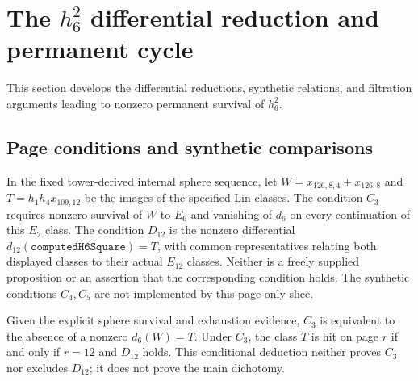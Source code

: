 \section{The $h_6^2$ differential reduction and permanent cycle}
\label{chap:near126}

This section develops the differential reductions, synthetic relations, and
filtration arguments leading to nonzero permanent survival of $h_6^2$.

\subsection{Page conditions and synthetic comparisons}

\begin{definition}
  \label{def:near126-fixed-page-conditions}
  \notready
  In the fixed tower-derived internal sphere sequence, let
  $W=x_{126,8,4}+x_{126,8}$ and $T=h_1h_4x_{109,12}$ be the images of the
  specified Lin classes.  The condition $C_3$ requires nonzero survival of
  $W$ to $E_6$ and vanishing of $d_6$ on every continuation of this $E_2$
  class.  The condition $D_{12}$ is the nonzero differential
  $d_{12}(\mathtt{computedH6Square})=T$, with common representatives relating
  both displayed classes to their actual $E_{12}$ classes.
  Neither is a freely supplied proposition or an assertion that the
  corresponding condition holds.  The synthetic conditions $C_4,C_5$ are
  not implemented by this page-only slice.
\end{definition}

\begin{lemma}
  \label{lem:near126-fixed-c3-incoming}
  \notready
  Given the explicit sphere survival and exhaustion evidence,
  $C_3$ is equivalent to the absence of a nonzero $d_6(W)=T$.
  Under $C_3$, the class $T$ is hit on page $r$ if and only if
  $r=12$ and $D_{12}$ holds.  This conditional deduction neither proves
  $C_3$ nor excludes $D_{12}$; it does not prove the main dichotomy.
\end{lemma}

